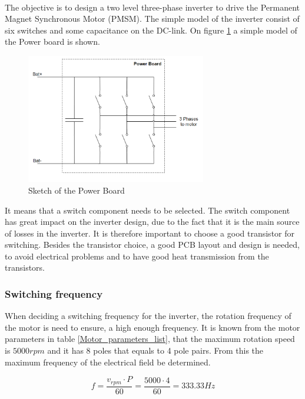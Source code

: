 \\
The objective is to design a two level three-phase inverter to drive the Permanent Magnet Synchronous Motor (PMSM). The simple model of the inverter consist of six switches and some capacitance on the DC-link. On figure \ref{fig:Sketch_PowerBoard} a simple model of the Power board is shown.

    \begin{figure}[H]
		\centering
		\includegraphics[width=0.7\textwidth]{pictures/hardware/Power_Board/Sketch_of_powerBoard.PNG}
		\caption{Sketch of the Power Board}
		\label{fig:Sketch_PowerBoard}
	\end{figure} 
	
It means that a switch component needs to be selected. The switch component has great impact on the inverter design, due to the fact that it is the main source of losses in the inverter. It is therefore important to choose a good transistor for switching. Besides the transistor choice, a good PCB layout and design is needed, to avoid electrical problems and to have good heat transmission from the transistors.

\subsubsection{Switching frequency} \label{switching_frequency}
When deciding a switching frequency for the inverter, the rotation frequency of the motor  is  need  to  ensure,  a  high  enough  frequency. 
It is known from the motor parameters in table \ref{Motor_parameters_list}, that the maximum rotation speed  is $5000 rpm$ and it has 8 poles that equals to 4 pole pairs. From this the maximum frequency of the electrical field be determined.

\begin{equation}
    f = \frac{v_{rpm} \cdot P}{60} = \frac{5000 \cdot 4}{60} = 333.33 Hz
    \label{eq:max_frequency}
\end{equation}

